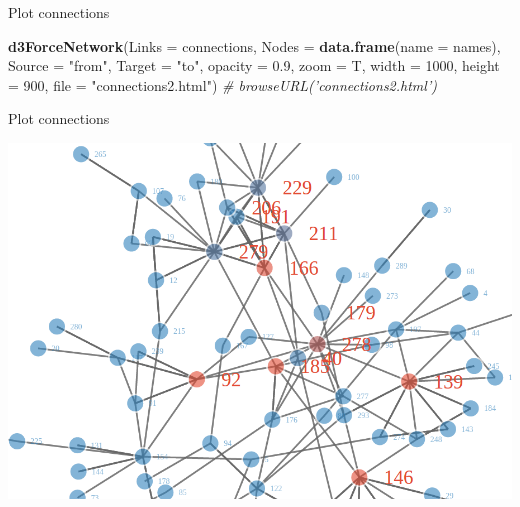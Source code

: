 \documentclass[ignorenonframetext,]{beamer}
\newenvironment{Shaded}{\begin{snugshade}}{\end{snugshade}}
\newcommand{\KeywordTok}[1]{\textcolor[rgb]{0.13,0.29,0.53}{\textbf{{#1}}}}
\newcommand{\DataTypeTok}[1]{\textcolor[rgb]{0.13,0.29,0.53}{{#1}}}
\newcommand{\DecValTok}[1]{\textcolor[rgb]{0.00,0.00,0.81}{{#1}}}
\newcommand{\FloatTok}[1]{\textcolor[rgb]{0.00,0.00,0.81}{{#1}}}
\newcommand{\StringTok}[1]{\textcolor[rgb]{0.31,0.60,0.02}{{#1}}}
\newcommand{\CommentTok}[1]{\textcolor[rgb]{0.56,0.35,0.01}{\textit{{#1}}}}
\newcommand{\NormalTok}[1]{{#1}}
\begin{document}
\begin{frame}[fragile]{Plot connections}

\begin{Shaded}
\begin{Highlighting}[]
\KeywordTok{d3ForceNetwork}\NormalTok{(}\DataTypeTok{Links =} \NormalTok{connections, }\DataTypeTok{Nodes =} \KeywordTok{data.frame}\NormalTok{(}\DataTypeTok{name =} \NormalTok{names), }\DataTypeTok{Source =} \StringTok{"from"}\NormalTok{, }
    \DataTypeTok{Target =} \StringTok{"to"}\NormalTok{, }\DataTypeTok{opacity =} \FloatTok{0.9}\NormalTok{, }\DataTypeTok{zoom =} \NormalTok{T, }\DataTypeTok{width =} \DecValTok{1000}\NormalTok{, }\DataTypeTok{height =} \DecValTok{900}\NormalTok{, }\DataTypeTok{file =} \StringTok{"connections2.html"}\NormalTok{)}
\CommentTok{# browseURL('connections2.html')}
\end{Highlighting}
\end{Shaded}

\end{frame}

\begin{frame}{Plot connections}

\includegraphics{fig/network1.png}

\end{frame}
\end{document}
